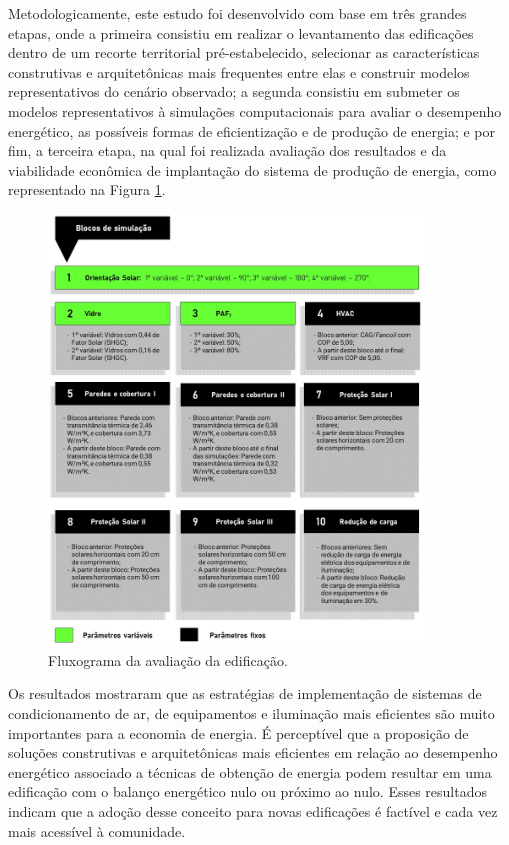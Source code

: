 \begin{onehalfspace}
    \noindent 

    \noindent Metodologicamente, este estudo foi desenvolvido com base em três 
    grandes etapas, onde a primeira consistiu em realizar o levantamento das edificações 
    dentro de um recorte territorial pré-estabelecido, selecionar as características 
    construtivas e arquitetônicas mais frequentes entre elas e construir modelos 
    representativos do cenário observado; a segunda consistiu em submeter os modelos
    representativos à simulações computacionais para avaliar o desempenho energético, 
    as possíveis formas de eficientização e de produção de energia; e por fim, a 
    terceira etapa, na qual foi realizada avaliação dos resultados e da viabilidade 
    econômica de implantação do sistema de produção de energia, como representado 
    na Figura \ref{fig:1}.\vspace*{0.3cm}
    \begin{figure}[H]
        \label{fig:1}
        \centering
        \includegraphics[width=0.9\textwidth]{figures/0_Fluxogramas-4.jpg}
        \caption{Fluxograma da avaliação da edificação.}
    \end{figure}
    
    \noindent Os resultados mostraram que as estratégias de implementação de sistemas
    de condicionamento de ar, de equipamentos e iluminação mais eficientes são muito importantes
    para a economia de energia. É perceptível que a proposição de soluções construtivas e
    arquitetônicas mais eficientes em relação ao desempenho energético associado a técnicas de
    obtenção de energia podem resultar em uma edificação com o balanço energético nulo ou
    próximo ao nulo. Esses resultados indicam que a adoção desse conceito para novas edificações é
    factível e cada vez mais acessível à comunidade.\vspace*{0.3cm}
\end{onehalfspace}
